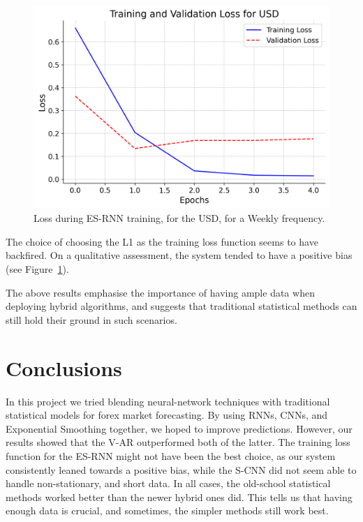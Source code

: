 \documentclass[conference]{IEEEtran}
\begin{document}
\begin{figure}[htbp]
\centerline{\includegraphics[width=\linewidth]{USD_loss_plot.png}}
\caption{Loss during ES-RNN training, for the USD, for a Weekly frequency.}
\label{fig:loss}
\end{figure}

The choice of choosing the L1 as the training loss function seems to have backfired. On a qualitative assessment, the system tended to have a positive bias (see Figure~\ref{fig:loss}). 

The above results emphasise the importance of having ample data when deploying hybrid algorithms, and suggests that traditional statistical methods can still hold their ground in such scenarios.

\section{Conclusions}

In this project we tried blending neural-network techniques with traditional statistical models for forex market forecasting. By using RNNs, CNNs, and Exponential Smoothing together, we hoped to improve predictions. However, our results showed that the V-AR outperformed both of the latter. The training loss function for the ES-RNN might not have been the best choice, as our system consistently leaned towards a positive bias, while the S-CNN did not seem able to handle non-stationary, and short data. In all cases, the old-school statistical methods worked better than the newer hybrid ones did. This tells us that having enough data is crucial, and sometimes, the simpler methods still work best.
\end{document}
